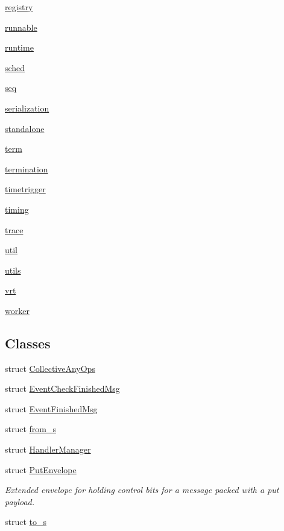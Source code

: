 \begin{DoxyCompactItemize}
 \hyperlink{namespacevt_1_1registry}{registry}
\item 
 \hyperlink{namespacevt_1_1runnable}{runnable}
\item 
 \hyperlink{namespacevt_1_1runtime}{runtime}
\item 
 \hyperlink{namespacevt_1_1sched}{sched}
\item 
 \hyperlink{namespacevt_1_1seq}{seq}
\item 
 \hyperlink{namespacevt_1_1serialization}{serialization}
\item 
 \hyperlink{namespacevt_1_1standalone}{standalone}
\item 
 \hyperlink{namespacevt_1_1term}{term}
\item 
 \hyperlink{namespacevt_1_1termination}{termination}
\item 
 \hyperlink{namespacevt_1_1timetrigger}{timetrigger}
\item 
 \hyperlink{namespacevt_1_1timing}{timing}
\item 
 \hyperlink{namespacevt_1_1trace}{trace}
\item 
 \hyperlink{namespacevt_1_1util}{util}
\item 
 \hyperlink{namespacevt_1_1utils}{utils}
\item 
 \hyperlink{namespacevt_1_1vrt}{vrt}
\item 
 \hyperlink{namespacevt_1_1worker}{worker}
\end{DoxyCompactItemize}
\subsection*{Classes}
\begin{DoxyCompactItemize}
\item 
struct \hyperlink{structvt_1_1_collective_any_ops}{Collective\+Any\+Ops}
\item 
struct \hyperlink{structvt_1_1_event_check_finished_msg}{Event\+Check\+Finished\+Msg}
\item 
struct \hyperlink{structvt_1_1_event_finished_msg}{Event\+Finished\+Msg}
\item 
struct \hyperlink{structvt_1_1from__s}{from\+\_\+s}
\item 
struct \hyperlink{structvt_1_1_handler_manager}{Handler\+Manager}
\item 
struct \hyperlink{structvt_1_1_put_envelope}{Put\+Envelope}
\begin{DoxyCompactList}\small\item\em Extended envelope for holding control bits for a message packed with a put payload. \end{DoxyCompactList}\item 
struct \hyperlink{structvt_1_1to__s}{to\+\_\+s}
\end{DoxyCompactItemize}
